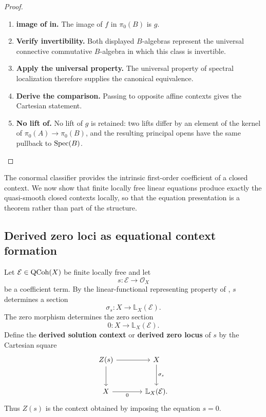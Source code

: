 \begin{proof}
\leavevmode
\begin{enumerate}[label=\textup{(\arabic*)}]
    \item \textbf{image of in.}
    The image of \(f\) in \(\pi_0(B)\) is \(g\).

    \item \textbf{Verify invertibility.}
    Both displayed \(B\)-algebras represent the universal connective commutative
    \(B\)-algebra in which this class is invertible.

    \item \textbf{Apply the universal property.}
    The universal property of spectral localization therefore supplies the canonical
    equivalence.

    \item \textbf{Derive the comparison.}
    Passing to opposite affine contexts gives the Cartesian statement.

    \item \textbf{No lift of.}
    No lift of \(g\) is retained: two lifts differ by an element of the kernel of
    \(\pi_0(A)\to\pi_0(B)\), and the resulting principal opens have the same pullback to \(\operatorname{Spec}(B)\).
\end{enumerate}
\end{proof}
The conormal classifier provides the intrinsic first-order coefficient of a
closed context. We now show that finite locally free linear equations produce
exactly the quasi-smooth closed contexts locally, so that the equation
presentation is a theorem rather than part of the structure.

\subsection{Derived zero loci as equational context formation}

\begin{construction}
\label{con:derived-zero-locus}
Let \(\mathcal E\in\operatorname{QCoh}(X)\) be finite locally free and let
\[
    s:\mathcal E\longrightarrow\mathcal O_X
\]
be a coefficient term. By the linear-functional representing property of
, \(s\) determines a section
\[
    \sigma_s:X\longrightarrow\mathbb L_X(\mathcal E).
\]
The zero morphism determines the zero section
\[
    0:X\longrightarrow\mathbb L_X(\mathcal E).
\]
Define the \textbf{derived solution context} or \textbf{derived zero locus} of
\(s\) by the Cartesian square
\[
\begin{tikzcd}[column sep=large, row sep=large]
    Z(s) \arrow[r] \arrow[d]
        & X \arrow[d,"\sigma_s"]
    \\
    X \arrow[r,"0"']
        & \mathbb L_X(\mathcal E).
\end{tikzcd}
\]
Thus \(Z(s)\) is the context obtained by imposing the equation \(s=0\).
\end{construction}

